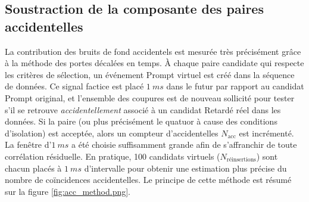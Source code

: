 \subsection{Soustraction de la composante des paires accidentelles}

\label{seq:acc_subtraction}

La contribution des bruits de fond accidentels est mesurée très précisément grâce à la méthode des portes décalées en temps. À chaque paire candidate qui respecte les critères de sélection, un événement Prompt virtuel est créé dans la séquence de données. Ce signal factice est placé $\SI{1}{ms}$ dans le futur par rapport au candidat Prompt original, et l'ensemble des coupures est de nouveau sollicité pour tester s'il se retrouve \textit{accidentellement} associé à un candidat Retardé réel dans les données. Si la paire (ou plus précisément le quatuor à cause des conditions d'isolation) est acceptée, alors un compteur d'accidentelles $N_\textrm{acc}$ est incrémenté. La fenêtre d'$\SI{1}{ms}$ a été choisie suffisamment grande afin de s'affranchir de toute corrélation résiduelle. En pratique, 100 candidats virtuels ($N_\textrm{réinsertions}$) sont chacun placés à $\SI{1}{ms}$ d'intervalle pour obtenir une estimation plus précise du nombre de coïncidences accidentelles. Le principe de cette méthode est résumé sur la figure \ref{fig:acc_method.png}.\\


